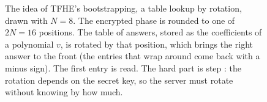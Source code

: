 \begin{figure}[!htb]
\centering

\caption{The idea of TFHE's bootstrapping, a table lookup by rotation, drawn
with $N=8$.  The encrypted phase is rounded to one of $2N=16$
positions.  The table of answers, stored as the coefficients of a
polynomial $v$, is rotated by that position, which brings the right answer to
the front (the entries that wrap around come back with a minus sign).
 The first entry is read. The hard part is step : the
rotation depends on the secret key, so the server must rotate without knowing
by how much.}
\label{fig:plan}
\end{figure}
